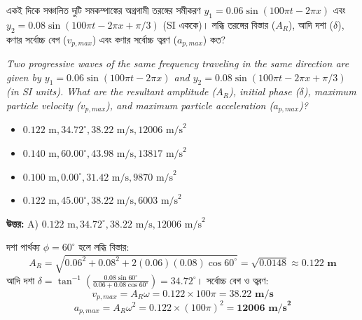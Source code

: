 \documentclass[12pt, a4paper]{article}
\begin{document}
\vspace{2em}

\begin{tcolorbox}[questionbox={প্রশ্ন (Question) 22}]
    \noindent
    একই দিকে সঞ্চালিত দুটি সমকম্পাঙ্কের অগ্রগামী তরঙ্গের সমীকরণ $y_1 = 0.06 \sin(100\pi t - 2\pi x)$ এবং $y_2 = 0.08 \sin(100\pi t - 2\pi x + \pi/3)$ (SI এককে)। লব্ধি তরঙ্গের বিস্তার ($A_R$), আদি দশা ($\delta$), কণার সর্বোচ্চ বেগ ($v_{p,max}$) এবং কণার সর্বোচ্চ ত্বরণ ($a_{p,max}$) কত?
    
    \vspace{0.8em}
    \begin{english}
    \noindent\textit{\color{darkgray}
    Two progressive waves of the same frequency traveling in the same direction are given by $y_1 = 0.06 \sin(100\pi t - 2\pi x)$ and $y_2 = 0.08 \sin(100\pi t - 2\pi x + \pi/3)$ (in SI units). What are the resultant amplitude ($A_R$), initial phase ($\delta$), maximum particle velocity ($v_{p,max}$), and maximum particle acceleration ($a_{p,max}$)?
    }
    \end{english}
\end{tcolorbox}

\begin{itemize}[label={}, leftmargin=1cm, itemsep=0.5em]
    \item[\textbf{A)}] $0.122\text{ m}, 34.72^\circ, 38.22\text{ m/s}, 12006\text{ m/s}^2$
    \item[\textbf{B)}] $0.140\text{ m}, 60.00^\circ, 43.98\text{ m/s}, 13817\text{ m/s}^2$
    \item[\textbf{C)}] $0.100\text{ m}, 0.00^\circ, 31.42\text{ m/s}, 9870\text{ m/s}^2$
    \item[\textbf{D)}] $0.122\text{ m}, 45.00^\circ, 38.22\text{ m/s}, 6003\text{ m/s}^2$
\end{itemize}

\vspace{0.5em}
\begin{tcolorbox}[answerbox]
    \textbf{\color{success} উত্তর:} A) $0.122\text{ m}, 34.72^\circ, 38.22\text{ m/s}, 12006\text{ m/s}^2$
\end{tcolorbox}
\vspace{1em}

\begin{tcolorbox}[solutionbox={সমাধান (Solution)}]
    \noindent
    দশা পার্থক্য $\phi = 60^\circ$ হলে লব্ধি বিস্তার:
    \[ A_R = \sqrt{0.06^2 + 0.08^2 + 2(0.06)(0.08)\cos 60^\circ} = \sqrt{0.0148} \approx \mathbf{0.122\text{ m}} \]
    আদি দশা $\delta = \tan^{-1}\left(\frac{0.08 \sin 60^\circ}{0.06 + 0.08 \cos 60^\circ}\right) = \mathbf{34.72^\circ}$। সর্বোচ্চ বেগ ও ত্বরণ:
    \[ v_{p,max} = A_R \omega = 0.122 \times 100\pi = \mathbf{38.22\text{ m/s}} \]
    \[ a_{p,max} = A_R \omega^2 = 0.122 \times (100\pi)^2 = \mathbf{12006\text{ m/s}^2} \]
\end{tcolorbox}
\end{document}
